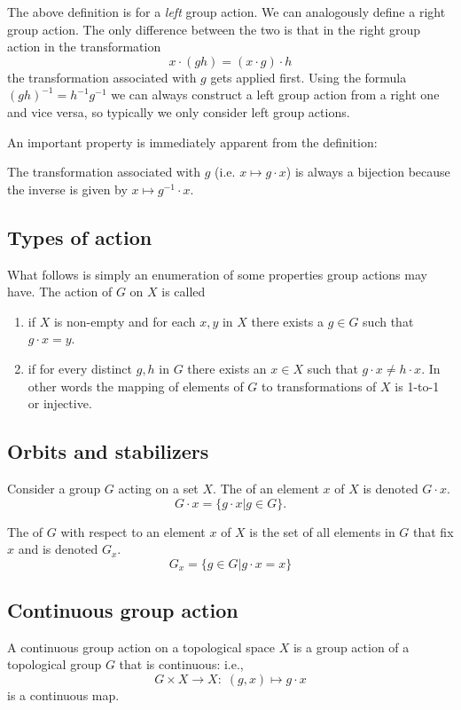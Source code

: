 The above definition is for a \textit{left} group action. We can analogously define a right group action. The only difference between the two is that in the right group action in the transformation
\[ x \cdot (gh) = (x\cdot g)\cdot h \]
the transformation associated with $g$ gets applied first. Using the formula $(gh)^{-1} = h^{-1}g^{-1}$ we can always construct a left group action from a right one and vice versa, so typically we only consider left group actions.

An important property is immediately apparent from the definition:
\begin{eigenschap}
The transformation associated with $g$ (i.e. $x\mapsto g\cdot x$) is always a bijection because the inverse is given by $x \mapsto g^{-1}\cdot x$.
\end{eigenschap}

\subsection{Types of action}
What follows is simply an enumeration of some properties group actions may have. The action of $G$ on $X$ is called
\begin{enumerate}
\item {} if $X$ is non-empty and for each $x,y$ in $X$ there exists a $g \in G$ such that $g\cdot x = y$.
\item {} if for every distinct $g,h$ in $G$ there exists an $x \in X$ such that $g\cdot x \neq h\cdot x$. In other words the mapping of elements of $G$ to transformations of $X$ is 1-to-1 or injective.
\end{enumerate}

\subsection{Orbits and stabilizers}
\begin{definition}
Consider a group $G$ acting on a set $X$. The  of an element $x$ of $X$ is denoted $G\cdot x$.
\[ G\cdot x = \{ g\cdot x | g\in G \}. \]
\end{definition}

The  of $G$ with respect to an element $x$ of $X$ is the set of all elements in $G$ that fix $x$ and is denoted $G_x$.
\[G_x = \{ g\in G | g\cdot x = x \} \]

\subsection{Continuous group action}
A continuous group action on a topological space $X$ is a group action of a topological group $G$ that is continuous: i.e.,
\[G \times X \to X : \;(g, x) \mapsto g \cdot x \]
is a continuous map.

